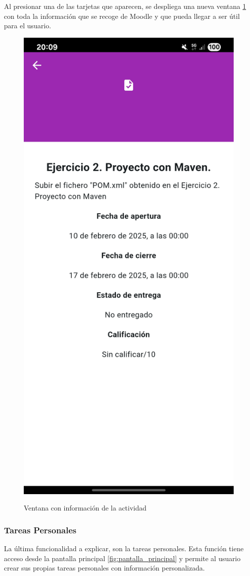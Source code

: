Al presionar una de las tarjetas que aparecen, se despliega una nueva ventana \ref{fig:tarea_gantt} con toda la información que se recoge de Moodle y que pueda llegar a ser útil para el usuario.
\begin{figure}[H]
    \centering
    {\includegraphics[width=0.25\linewidth]{img/tarea_gantt.jpg}}
     {\caption{Ventana con información de la actividad}
     \label{fig:tarea_gantt}}
\end{figure}

\subsubsection{Tareas Personales}
La última funcionalidad a explicar, son la tareas personales. Esta función tiene acceso desde la pantalla principal \ref{fig:pantalla_principal} y permite al usuario crear sus propias tareas personales con información personalizada.

